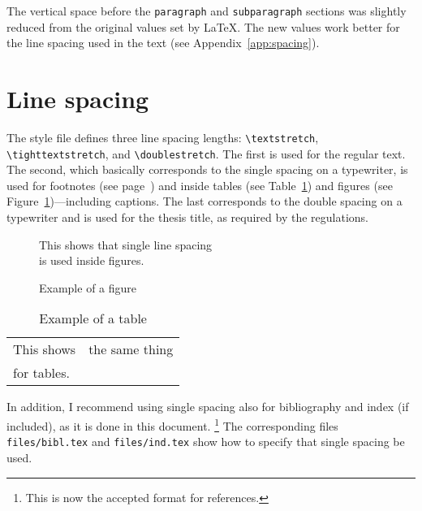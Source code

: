 The vertical space before the
\verb+paragraph+ and
\verb+subparagraph+ sections
was slightly reduced from the original values set by \LaTeX{}. The new
values work better for the line spacing used in the text (see
Appendix~\ref{app:spacing}).

\section{Line spacing}
\label{spacing}

The style file defines three line spacing lengths:
\verb+\textstretch+, \verb+\tighttextstretch+, and
\verb+\doublestretch+. The first is used for the regular text. The
second, which basically corresponds to the single spacing%
on a typewriter, is used for footnotes (see
page~\pageref{foot}) and inside tables (see
Table~\ref{tab1}) and figures (see
Figure~\ref{fig1})---including captions.
The last corresponds to the double spacing on a
typewriter and is used for the thesis title, as required by the
regulations.

\begin{figure}[htbp]
  \begin{center}
    This shows that single line spacing\\
    is used inside figures.
    \caption{Example of a figure\label{fig1}}
  \end{center}
\end{figure}
%
\vspace*{-.3in}
\begin{table}[htbp]
  \begin{center}
    \begin{tabular}[t]{|ll|}
      \hline
      This shows & the same thing\\
      for tables. & \\
      \hline
    \end{tabular}    
    \caption{Example of a table\label{tab1}}
  \end{center}
\end{table}

In addition, I recommend using single spacing also for
bibliography and index%
 (if included), as it is done in this
document.%
\footnote{This is now the accepted format for references.} The corresponding files
\texttt{files/bibl.tex} and
\texttt{files/ind.tex} show how to specify
that single spacing be used.


